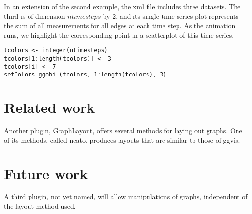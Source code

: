 \documentclass[11pt]{article}
\begin{document}
In an extension of the second example, the xml file includes three
datasets.  The third is of dimension $ntimesteps$ by $2$, and its
single time series plot represents the sum of all measurements
for all edges at each time step.  As the animation runs,
we highlight the corresponding point in a scatterplot of this time series.

\begin{verbatim}
tcolors <- integer(ntimesteps)
tcolors[1:length(tcolors)] <- 3
tcolors[i] <- 7
setColors.ggobi (tcolors, 1:length(tcolors), 3)
\end{verbatim}

\section{Related work}

Another plugin, GraphLayout, offers several methods for laying
out graphs.  One of its methods, called neato, produces layouts
that are similar to those of ggvis.

\section{Future work}

A third plugin, not yet named, will allow manipulations of
graphs, independent of the layout method used.


\end{document}
